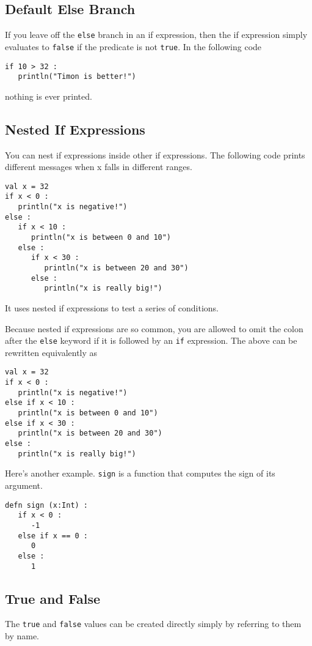 \documentclass[10pt,oneside]{book}
\begin{document}
\subsection*{Default Else Branch}
If you leave off the \texttt{\frenchspacing else} branch in an if expression, then the if expression simply evaluates to \texttt{\frenchspacing false} if the predicate is not \texttt{\frenchspacing true}. In the following code
\begin{lstlisting}
if 10 > 32 :
   println("Timon is better!")
\end{lstlisting}
nothing is ever printed. 

\subsection*{Nested If Expressions}
You can nest if expressions inside other if expressions. The following code prints different messages when x falls in different ranges.
\begin{lstlisting}
val x = 32
if x < 0 :
   println("x is negative!")
else :
   if x < 10 :
      println("x is between 0 and 10")
   else :
      if x < 30 :
         println("x is between 20 and 30")
      else :
         println("x is really big!")
\end{lstlisting}
It uses nested if expressions to test a series of conditions.

Because nested if expressions are so common, you are allowed to omit the colon after the \texttt{\frenchspacing else} keyword if it is followed by an \texttt{\frenchspacing if} expression. The above can be rewritten equivalently as

\begin{lstlisting}
val x = 32
if x < 0 :
   println("x is negative!")
else if x < 10 :
   println("x is between 0 and 10")
else if x < 30 :
   println("x is between 20 and 30")
else :
   println("x is really big!")
\end{lstlisting}

Here's another example. \texttt{\frenchspacing sign} is a function that computes the sign of its argument.
\begin{lstlisting}
defn sign (x:Int) :
   if x < 0 :
      -1
   else if x == 0 :
      0
   else :
      1
\end{lstlisting}

\subsection*{True and False}
The \texttt{\frenchspacing true} and \texttt{\frenchspacing false} values can be created directly simply by referring to them by name. 
\end{document}
